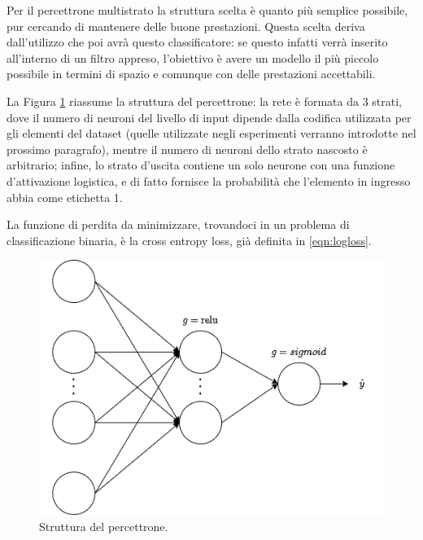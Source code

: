 \documentclass[../../main.tex]{subfiles}
\begin{document}
    Per il percettrone multistrato la struttura scelta è quanto più semplice possibile, pur cercando di mantenere delle buone prestazioni. Questa scelta deriva dall'utilizzo che poi avrà questo classificatore: se questo infatti verrà inserito all'interno di un filtro appreso, l'obiettivo è avere un modello il più piccolo possibile in termini di spazio e comunque con delle prestazioni accettabili.

    La Figura \ref{fig:strutturaPercettrone} riassume la struttura del percettrone: la rete è formata da 3 strati, dove il numero di neuroni del livello di input dipende dalla codifica utilizzata per gli elementi del dataset (quelle utilizzate negli esperimenti verranno introdotte nel prossimo paragrafo), mentre il numero di neuroni dello strato nascosto è arbitrario; infine, lo strato d'uscita contiene un solo neurone con una funzione d'attivazione logistica, e di fatto fornisce la probabilità che l'elemento in ingresso abbia come etichetta 1.

    La funzione di perdita da minimizzare, trovandoci in un problema di classificazione binaria, è la cross entropy loss, già definita in \eqref{eqn:logloss}.

    \begin{figure}[H]
        \centering
        \includegraphics[width=\textwidth]{immagini/6_4/percettroneStruttura.drawio.png}
        \caption{Struttura del percettrone.}
        \label{fig:strutturaPercettrone}
    \end{figure}
\end{document}
